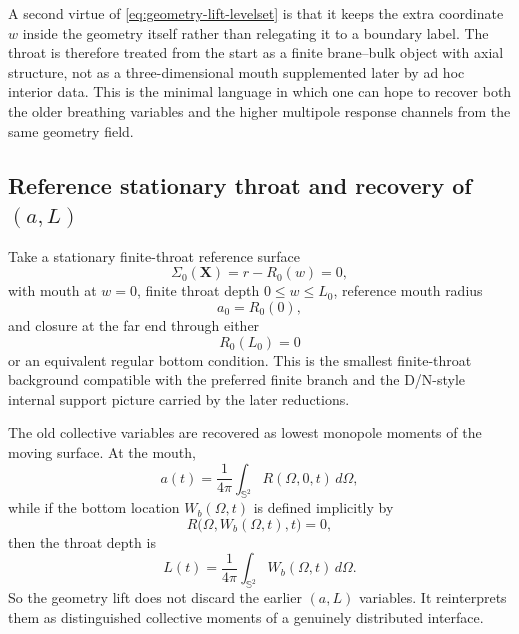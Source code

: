 \documentclass[11pt]{article}
\theoremstyle{definition}
\newcommand{\bbS}{\mathbb S}
\begin{document}
A second virtue of \eqref{eq:geometry-lift-levelset} is that it keeps the extra coordinate $w$ inside the geometry itself rather than relegating it to a boundary label. The throat is therefore treated from the start as a finite brane--bulk object with axial structure, not as a three-dimensional mouth supplemented later by ad hoc interior data. This is the minimal language in which one can hope to recover both the older breathing variables and the higher multipole response channels from the same geometry field.

\subsection{Reference stationary throat and recovery of \texorpdfstring{$(a,L)$}{(a,L)}}

Take a stationary finite-throat reference surface
\begin{equation}
\Sigma_0(\mathbf X)=r-R_0(w)=0,
\label{eq:geometry-lift-reference}
\end{equation}
with mouth at $w=0$, finite throat depth $0\leq w\leq L_0$, reference mouth radius
\begin{equation}
 a_0 = R_0(0),
 \label{eq:geometry-lift-a0}
\end{equation}
and closure at the far end through either
\begin{equation}
 R_0(L_0)=0
 \label{eq:geometry-lift-bottom-closure}
\end{equation}
or an equivalent regular bottom condition. This is the smallest finite-throat background compatible with the preferred finite branch and the D/N-style internal support picture carried by the later reductions.

The old collective variables are recovered as lowest monopole moments of the moving surface. At the mouth,
\begin{equation}
 a(t)=\frac{1}{4\pi}\int_{\bbS^2} R(\Omega,0,t)\,d\Omega,
 \label{eq:geometry-lift-a-moment}
\end{equation}
while if the bottom location $W_b(\Omega,t)$ is defined implicitly by
\begin{equation}
 R\bigl(\Omega,W_b(\Omega,t),t\bigr)=0,
 \label{eq:geometry-lift-bottom-function}
\end{equation}
then the throat depth is
\begin{equation}
 L(t)=\frac{1}{4\pi}\int_{\bbS^2} W_b(\Omega,t)\,d\Omega.
 \label{eq:geometry-lift-L-moment}
\end{equation}
So the geometry lift does not discard the earlier $(a,L)$ variables. It reinterprets them as distinguished collective moments of a genuinely distributed interface.
\end{document}
